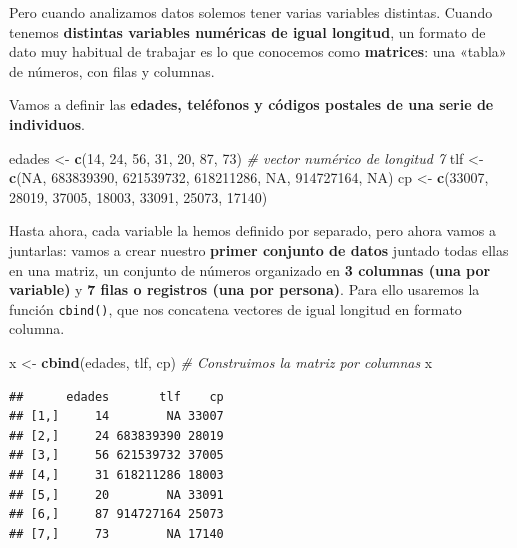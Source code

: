 \documentclass[11pt,]{book}
\newenvironment{Shaded}{\begin{snugshade}}{\end{snugshade}}
\newcommand{\CommentTok}[1]{\textcolor[rgb]{0.37,0.37,0.37}{\textit{#1}}}
\newcommand{\DecValTok}[1]{\textcolor[rgb]{0.06,0.06,0.06}{#1}}
\newcommand{\KeywordTok}[1]{\textcolor[rgb]{0.27,0.27,0.27}{\textbf{#1}}}
\newcommand{\NormalTok}[1]{#1}
\newcommand{\OtherTok}[1]{\textcolor[rgb]{0.37,0.37,0.37}{#1}}
\newcommand{\StringTok}[1]{\textcolor[rgb]{0.5,0.5,0.5}{#1}}
\begin{document}
Pero cuando analizamos datos solemos tener varias variables distintas. Cuando tenemos \textbf{distintas variables numéricas de igual longitud}, un formato de dato muy habitual de trabajar es lo que conocemos como \textbf{matrices}: una «tabla» de números, con filas y columnas.

Vamos a definir las \textbf{edades, teléfonos y códigos postales de una serie de individuos}.

\begin{Shaded}
\begin{Highlighting}[]
\NormalTok{edades <-}\StringTok{ }\KeywordTok{c}\NormalTok{(}\DecValTok{14}\NormalTok{, }\DecValTok{24}\NormalTok{, }\DecValTok{56}\NormalTok{, }\DecValTok{31}\NormalTok{, }\DecValTok{20}\NormalTok{, }\DecValTok{87}\NormalTok{, }\DecValTok{73}\NormalTok{) }\CommentTok{# vector numérico de longitud 7}
\NormalTok{tlf <-}\StringTok{ }\KeywordTok{c}\NormalTok{(}\OtherTok{NA}\NormalTok{, }\DecValTok{683839390}\NormalTok{, }\DecValTok{621539732}\NormalTok{, }\DecValTok{618211286}\NormalTok{, }\OtherTok{NA}\NormalTok{, }\DecValTok{914727164}\NormalTok{, }\OtherTok{NA}\NormalTok{)}
\NormalTok{cp <-}\StringTok{ }\KeywordTok{c}\NormalTok{(}\DecValTok{33007}\NormalTok{, }\DecValTok{28019}\NormalTok{, }\DecValTok{37005}\NormalTok{, }\DecValTok{18003}\NormalTok{, }\DecValTok{33091}\NormalTok{, }\DecValTok{25073}\NormalTok{, }\DecValTok{17140}\NormalTok{)}
\end{Highlighting}
\end{Shaded}

Hasta ahora, cada variable la hemos definido por separado, pero ahora vamos a juntarlas: vamos a crear nuestro \textbf{primer conjunto de datos} juntado todas ellas en una matriz, un conjunto de números organizado en \textbf{3 columnas (una por variable)} y \textbf{7 filas o registros (una por persona)}. Para ello usaremos la función \texttt{cbind()}, que nos concatena vectores de igual longitud en formato columna.

\begin{Shaded}
\begin{Highlighting}[]
\NormalTok{x <-}\StringTok{ }\KeywordTok{cbind}\NormalTok{(edades, tlf, cp) }\CommentTok{# Construimos la matriz por columnas}
\NormalTok{x}
\end{Highlighting}
\end{Shaded}

\begin{verbatim}
##      edades       tlf    cp
## [1,]     14        NA 33007
## [2,]     24 683839390 28019
## [3,]     56 621539732 37005
## [4,]     31 618211286 18003
## [5,]     20        NA 33091
## [6,]     87 914727164 25073
## [7,]     73        NA 17140
\end{verbatim}
\end{document}
